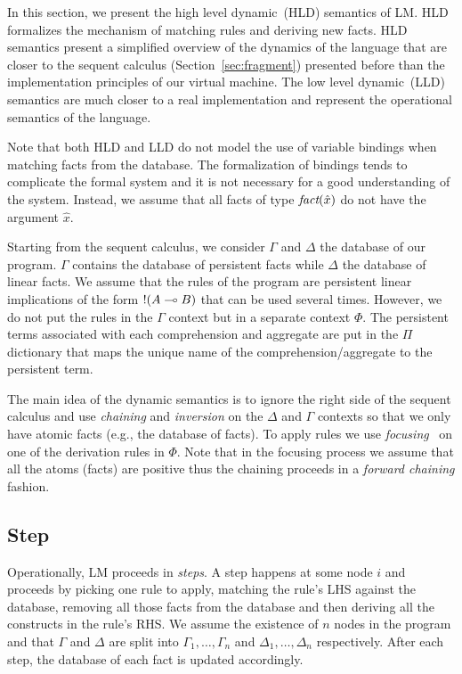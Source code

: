 
In this section, we present the high level dynamic~(HLD) semantics of LM.  HLD
formalizes the mechanism of matching rules and deriving new facts.  HLD
semantics present a simplified overview of the dynamics of the language that are
closer to the sequent calculus (Section~\ref{sec:fragment}) presented before
than the implementation principles of our virtual machine. The low level
dynamic~(LLD) semantics are much closer to a real implementation and
represent the operational semantics of the language.

Note that both HLD and LLD do not model the use of variable bindings when
matching facts from the database. The formalization of bindings tends to
complicate the formal system and it is not necessary for a good understanding of
the system. Instead, we assume that all facts of type $\emph{fact}(\hat{x})$ do
not have the argument $\hat{x}$.

Starting from the sequent calculus, we consider $\Gamma$ and $\Delta$ the
database of our program. $\Gamma$ contains the database of persistent facts
while $\Delta$ the database of linear facts. We assume that the rules of the
program are persistent linear implications of the form ${!} (A \multimap B)$ that
can be used several times. However, we do not put the rules in the $\Gamma$
context but in a separate context $\Phi$. The persistent terms associated with
each comprehension and aggregate are put in the $\Pi$ dictionary that maps the
unique name of the comprehension/aggregate to the persistent term.

The main idea of the dynamic semantics is to ignore the right side of the
sequent calculus and use \emph{chaining} and \emph{inversion} on the $\Delta$
and $\Gamma$ contexts so that we only have atomic facts (e.g., the database of
facts). To apply rules we use
\emph{focusing}~\cite{Andreoli92logicprogramming} on one of the derivation rules
in $\Phi$. Note that in the focusing process we assume that all the atoms
(facts) are positive thus the chaining proceeds in a \emph{forward chaining}
fashion.

\subsection{Step}\label{sec:step_hld}

Operationally, LM proceeds in \emph{steps}. A step happens at some node $i$ and
proceeds by picking one rule to apply, matching the rule's LHS against the
database, removing all those facts from the database and then deriving all the
constructs in the rule's RHS. We assume the existence of $n$ nodes in the
program and that $\Gamma$ and $\Delta$ are split into $\Gamma_1, \dotsc,
\Gamma_n$ and $\Delta_1, \dotsc, \Delta_n$ respectively. After each step, the
database of each fact is updated accordingly.

